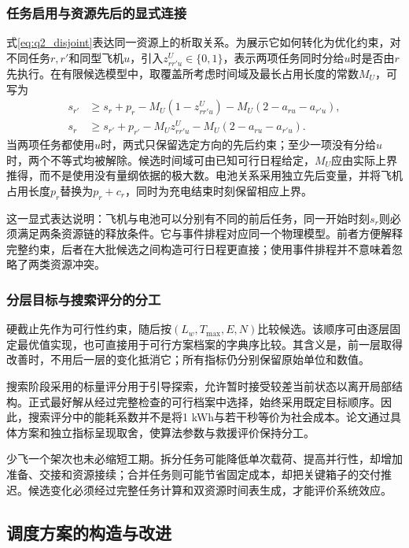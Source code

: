 \documentclass[withoutpreface,colorprint]{format}
\numberwithin{equation}{section}
\numberwithin{figure}{section}
\numberwithin{table}{section}
\begin{document}
\subsubsection{任务启用与资源先后的显式连接}
式\eqref{eq:q2_disjoint}表达同一资源上的析取关系。为展示它如何转化为优化约束，对不同任务$r,r'$和同型飞机$u$，引入$z^U_{rr'u}\in\{0,1\}$，表示两项任务同时分给$u$时是否由$r$先执行。在有限候选模型中，取覆盖所考虑时间域及最长占用长度的常数$M_U$，可写为
\begin{equation}
\begin{aligned}
s_{r'}&\ge s_r+p_r-M_U(1-z^U_{rr'u})-M_U(2-a_{ru}-a_{r'u}),\\
s_r&\ge s_{r'}+p_{r'}-M_Uz^U_{rr'u}-M_U(2-a_{ru}-a_{r'u}).
\end{aligned}
\label{eq:q2_plane_disjunction}
\end{equation}
当两项任务都使用$u$时，两式只保留选定方向的先后约束；至少一项没有分给$u$时，两个不等式均被解除。候选时间域可由已知可行日程给定，$M_U$应由实际上界推得，而不是使用没有量纲依据的极大数。电池关系采用独立先后变量，并将飞机占用长度$p_r$替换为$p_r+c_r$，同时为充电结束时刻保留相应上界。

这一显式表达说明：飞机与电池可以分别有不同的前后任务，同一开始时刻$s_r$则必须满足两条资源链的释放条件。它与事件排程对应同一个物理模型。前者方便解释完整约束，后者在大批候选之间构造可行日程更直接；使用事件排程并不意味着忽略了两类资源冲突。

\subsubsection{分层目标与搜索评分的分工}
硬截止先作为可行性约束，随后按$(L_w,T_{\max},E,N)$比较候选。该顺序可由逐层固定最优值实现，也可直接用于可行方案档案的字典序比较。其含义是，前一层取得改善时，不用后一层的变化抵消它；所有指标仍分别保留原始单位和数值。

搜索阶段采用的标量评分用于引导探索，允许暂时接受较差当前状态以离开局部结构。正式最好解从经过完整检查的可行档案中选择，始终采用既定目标顺序。因此，搜索评分中的能耗系数并不是将1 kWh与若干秒等价为社会成本。论文通过具体方案和独立指标呈现取舍，使算法参数与救援评价保持分工。

少飞一个架次也未必缩短工期。拆分任务可能降低单次载荷、提高并行性，却增加准备、交接和资源接续；合并任务则可能节省固定成本，却把关键箱子的交付推迟。候选变化必须经过完整任务计算和双资源时间表生成，才能评价系统效应。


\subsection{调度方案的构造与改进}
\end{document}
